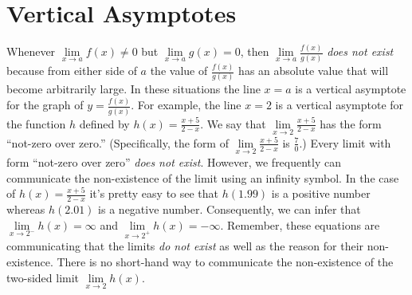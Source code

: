 \documentclass[10pt,oneside,]{book}
\theoremstyle{plain}
\theoremstyle{definition}
\numberwithin{equation}{section}
\newcommand{\fe}[2]{#1\mathopen{}\left(#2\right)\mathclose{}}
\begin{document}
\section[Vertical Asymptotes]{Vertical Asymptotes}\label{section-vertical-asymptotes}
Whenever \(\lim\limits_{x\to a}\fe{f}{x}\neq0\) but \(\lim\limits_{x\to a}\fe{g}{x}=0\), then \(\lim\limits_{x\to a}\frac{\fe{f}{x}}{\fe{g}{x}}\) \emph{does not exist} because from either side of \(a\) the value of \(\frac{\fe{f}{x}}{\fe{g}{x}}\) has an absolute value that will become arbitrarily large. In these situations the line \(x=a\) is a vertical asymptote for the graph of \(y=\frac{\fe{f}{x}}{\fe{g}{x}}\). For example, the line \(x=2\) is a vertical asymptote for the function \(h\) defined by \(\fe{h}{x}=\frac{x+5}{2-x}\). We say that \(\lim\limits_{x\to 2}\frac{x+5}{2-x}\) has the form ``not-zero over zero.'' (Specifically, the form of \(\lim\limits_{x\to 2}\frac{x+5}{2-x}\) is \(\frac{7}{0}\).) Every limit with form ``not-zero over zero'' \emph{does not exist}. However, we frequently can communicate the non-existence of the limit using an infinity symbol. In the case of \(\fe{h}{x}=\frac{x+5}{2-x}\) it's pretty easy to see that \(\fe{h}{1.99}\) is a positive number whereas \(\fe{h}{2.01}\) is a negative number. Consequently, we can infer that \(\lim\limits_{x\to 2^{-}}\fe{h}{x}=\infty\) and \(\lim\limits_{x\to 2^{+}}\fe{h}{x}=-\infty\). Remember, these equations are communicating that the limits \emph{do not exist} as well as the reason for their non-existence. There is no short-hand way to communicate the non-existence of the two-sided limit \(\lim\limits_{x\to 2}\fe{h}{x}\).%
\typeout{************************************************}
\typeout{************************************************}
\end{document}
